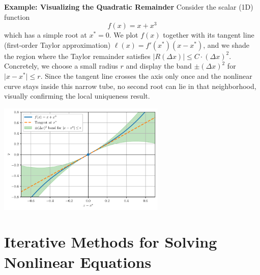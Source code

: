 \begin{exampleBox}
\textbf{Example: Visualizing the Quadratic Remainder}
Consider the scalar (1D) function
\[
f(x) = x + x^3
\]
which has a simple root at \(x^*=0\).  We plot \(f(x)\) together with its tangent line (first-order Taylor approximation)
\(\ell(x)=f'(x^*)(x-x^*)\), and we shade the region where the Taylor remainder satisfies
\(\lvert R(\Delta x)\rvert \le C \cdot (\Delta x)^2\).  Concretely, we choose a small radius \(r\) and display
the band \(\pm(\Delta x)^2\) for \(\lvert x-x^*\rvert\le r\).  Since the tangent line crosses the axis
only once and the nonlinear curve stays inside this narrow tube, no second root can lie in that
neighborhood, visually confirming the local uniqueness result.

\begin{center}
    \includegraphics[width=0.6\textwidth]{figs/nle/tangent_band.pdf}
\end{center}
\end{exampleBox}

\section{Iterative Methods for Solving Nonlinear Equations}

